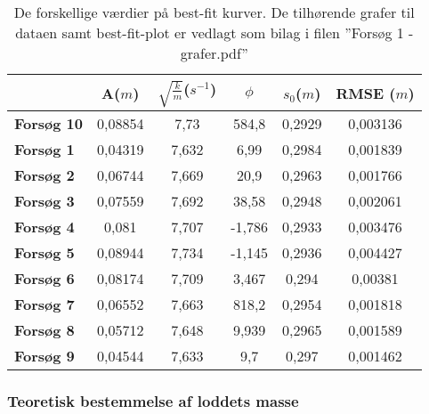 \begin{table}[h]
\centering
\begin{tabular}{|l|c|c|c|c|c|}
\hline
\textbf{}          & \textbf{A}($m$) & \textbf{$\sqrt{\frac{k}{m}}$}($s^{-1}$) & \textbf{$\phi$} & \textbf{$s_0$}($m$) & \textbf{RMSE }($m$) \\ \hline
\textbf{Forsøg 10} & 0,08854    & 7,73                          & 584,8           & 0,2929         & 0,003136      \\ \hline
\textbf{Forsøg 1}  & 0,04319    & 7,632                         & 6,99            & 0,2984         & 0,001839      \\ \hline
\textbf{Forsøg 2}  & 0,06744    & 7,669                         & 20,9            & 0,2963         & 0,001766      \\ \hline
\textbf{Forsøg 3}  & 0,07559    & 7,692                         & 38,58           & 0,2948         & 0,002061      \\ \hline
\textbf{Forsøg 4}  & 0,081      & 7,707                         & -1,786          & 0,2933         & 0,003476      \\ \hline
\textbf{Forsøg 5}  & 0,08944    & 7,734                         & -1,145          & 0,2936         & 0,004427      \\ \hline
\textbf{Forsøg 6}  & 0,08174    & 7,709                         & 3,467           & 0,294          & 0,00381       \\ \hline
\textbf{Forsøg 7}  & 0,06552    & 7,663                         & 818,2           & 0,2954         & 0,001818      \\ \hline
\textbf{Forsøg 8}  & 0,05712    & 7,648                         & 9,939           & 0,2965         & 0,001589      \\ \hline
\textbf{Forsøg 9}  & 0,04544    & 7,633                         & 9,7             & 0,297          & 0,001462      \\ \hline
\end{tabular}

\caption{De forskellige værdier på best-fit kurver. De tilhørende grafer til dataen samt best-fit-plot er vedlagt som bilag i filen ''Forsøg 1 - grafer.pdf''}
\label{tabel: bestfitkurver forsog 1}
\end{table}

\subsubsection{Teoretisk bestemmelse af loddets masse}\label{exp1: teoretisk bestemmelse af loddets masse}


